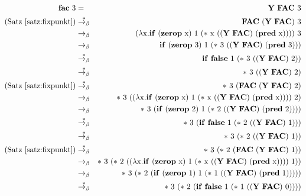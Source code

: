 \begin{figure}[!tb]
  \begin{center}
    \scriptsize
    \begin{eqnarray*}
    \mathbf{fac}~3 &=& \mathbf{Y}~\mathbf{FAC}~3\\
    \text{(Satz~\ref{satz:fixpunkt})} &\overset{\ast}{\rightarrow_{\beta}}&
    \mathbf{FAC}~(\mathbf{Y}~\mathbf{FAC})~3\\
    &\rightarrow_{\beta}&
    (\lambda \lrm x.\mathbf{if}~(\mathbf{zerop}~\lrm x)~1~(\ast~\lrm x~((\mathbf{Y}~\mathbf{FAC})~(\mathbf{pred}~\lrm x))))~3\\
    &\rightarrow_{\beta}&
    \mathbf{if}~(\mathbf{zerop}~ 3)~1~(\ast~3~((\mathbf{Y}~\mathbf{FAC})~(\mathbf{pred}~3)))
    \\
    &\overset{\ast}{\rightarrow_{\beta}}&
    \mathbf{if}~\mathbf{false}~1~(\ast~3~((\mathbf{Y}~\mathbf{FAC})~2))\\
    &\overset{\ast}{\rightarrow_{\beta}}&
    \ast~3~((\mathbf{Y}~\mathbf{FAC})~2)\\
    \text{(Satz~\ref{satz:fixpunkt})} &\overset{\ast}{\rightarrow_{\beta}}&
    \ast~3~(\mathbf{FAC}~(\mathbf{Y}~\mathbf{FAC})~2)\\
    &\rightarrow_{\beta}&
    \ast~3~((\lambda
    \lrm x.\mathbf{if}~(\mathbf{zerop}~\lrm x)~1~(\ast~\lrm x~((\mathbf{Y}~\mathbf{FAC})~(\mathbf{pred}~\lrm x))))~2)\\
    &\rightarrow_{\beta}&
    \ast~3~(\mathbf{if}~(\mathbf{zerop}~ 2)~1~(\ast~2~((\mathbf{Y}~\mathbf{FAC})~(\mathbf{pred}~2))))\\
    &\overset{\ast}{\rightarrow_{\beta}}&
    \ast~3~(\mathbf{if}~\mathbf{false}~1~(\ast~2~((\mathbf{Y}~\mathbf{FAC})~1)))\\
    &\overset{\ast}{\rightarrow_{\beta}}&
    \ast~3~(\ast~2~((\mathbf{Y}~\mathbf{FAC})~1))\\
    \text{(Satz~\ref{satz:fixpunkt})} &\overset{\ast}{\rightarrow_{\beta}}&
    \ast~3~(\ast~2~(\mathbf{FAC}~(\mathbf{Y}~\mathbf{FAC})~1))\\
    &\rightarrow_{\beta}&
    \ast~3~(\ast~2~((\lambda
    \lrm x.\mathbf{if}~(\mathbf{zerop}~\lrm x)~1~(\ast~\lrm x~((\mathbf{Y}~\mathbf{FAC})~(\mathbf{pred}~\lrm x))))~1))\\
%
%
    &\rightarrow_{\beta}&
    \ast~3~(\ast~2~(\mathbf{if}~(\mathbf{zerop}~1)~1~(\ast~1~((\mathbf{Y}~\mathbf{FAC})~(\mathbf{pred}~1)))))\\
    &\overset{\ast}{\rightarrow_{\beta}}&
    \ast~3~(\ast~2~(\mathbf{if}~\mathbf{false}~1~(\ast~1~((\mathbf{Y}~\mathbf{FAC})~0))))\\

\end{eqnarray*}
\end{center}
\end{figure}
